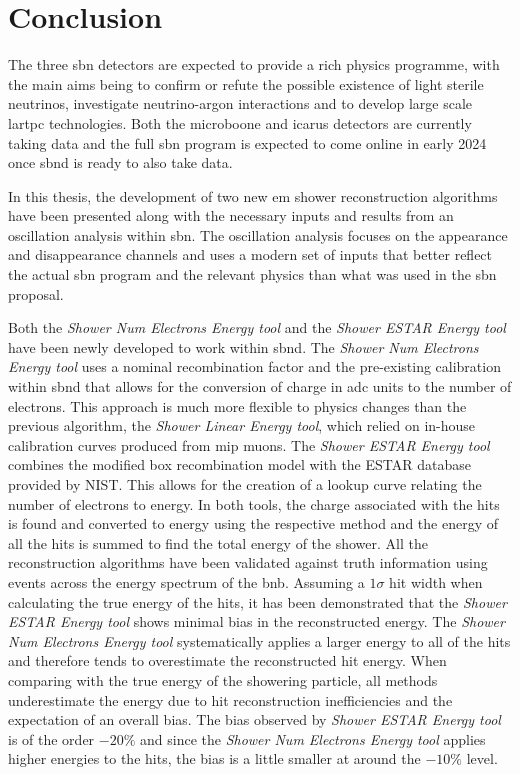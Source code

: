 \chapter{Conclusion}
\label{chap:Conclusion}

The three \gls{sbn} detectors are expected to provide a rich physics programme, with the main aims being to confirm or refute the possible existence of light sterile neutrinos, investigate neutrino-argon interactions and to develop large scale \gls{lartpc} technologies. Both the \gls{microboone} and \gls{icarus} detectors are currently taking data and the full \gls{sbn} program is expected to come online in early 2024 once \gls{sbnd} is ready to also take data. 

In this thesis, the development of two new \gls{em} shower reconstruction algorithms have been presented along with the necessary inputs and results from an oscillation analysis within \gls{sbn}. The oscillation analysis focuses on the \nue appearance and disappearance channels and uses a modern set of inputs that better reflect the actual \gls{sbn} program and the relevant physics than what was used in the \gls{sbn} proposal.

Both the \textit{Shower Num Electrons Energy tool} and the \textit{Shower ESTAR Energy tool} have been newly developed to work within \gls{sbnd}. The \textit{Shower Num Electrons Energy tool} uses a nominal recombination factor and the pre-existing calibration within \gls{sbnd} that allows for the conversion of charge in \gls{adc} units to the number of electrons. This approach is much more flexible to physics changes than the previous algorithm, the \textit{Shower Linear Energy tool}, which relied on in-house calibration curves produced from \gls{mip} muons. The \textit{Shower ESTAR Energy tool} combines the modified box recombination model with the ESTAR database provided by NIST. This allows for the creation of a lookup curve relating the number of electrons to energy. In both tools, the charge associated with the hits is found and converted to energy using the respective method and the energy of all the hits is summed to find the total energy of the shower. All the reconstruction algorithms have been validated against truth information using events across the energy spectrum of the \gls{bnb}. Assuming a $1\sigma$ hit width when calculating the true energy of the hits, it has been demonstrated that the \textit{Shower ESTAR Energy tool} shows minimal bias in the reconstructed energy. The \textit{Shower Num Electrons Energy tool} systematically applies a larger energy to all of the hits and therefore tends to overestimate the reconstructed hit energy. When comparing with the true energy of the showering particle, all methods underestimate the energy due to hit reconstruction inefficiencies and the expectation of an overall bias. The bias observed by \textit{Shower ESTAR Energy tool} is of the order $-20\%$ and since the \textit{Shower Num Electrons Energy tool} applies higher energies to the hits, the bias is a little smaller at around the $-10\%$ level.

